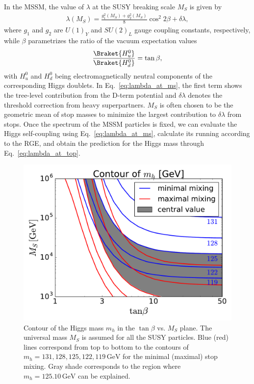 \documentclass[12pt,twoside,book]{article}
\begin{document}
In the MSSM, the value of $\lambda$ at the SUSY breaking scale $M_S$ is given by
\begin{align}
  \lambda (M_S) = \frac{g_1^2 (M_S) + g_2^2 (M_S)}{8} \cos^2 2\beta + \delta \lambda,
  \label{eq:lambda_at_ms}
\end{align}
where $g_1$ and $g_2$ are $U(1)_Y$ and $SU(2)_L$ gauge coupling constants, respectively, while $\beta$ parametrizes the ratio of the vacuum expectation values
\begin{align}
  \frac{\Braket{H_u^0}}{\Braket{H_d^0}} = \tan \beta,
\end{align}
with $H_u^0$ and $H_d^0$ being electromagnetically neutral components of the corresponding Higgs doublets.
In Eq.~\eqref{eq:lambda_at_ms}, the first term shows the tree-level contribution from the D-term potential and $\delta \lambda$ denotes the threshold correction from heavy superpartners.
$M_S$ is often chosen to be the geometric mean of stop masses to minimize the largest contribution to $\delta \lambda$ from stops.
Once the spectrum of the MSSM particles is fixed, we can evaluate the Higgs self-coupling using Eq.~\eqref{eq:lambda_at_ms}, calculate its running according to the RGE, and obtain the prediction for the Higgs mass through Eq.~\eqref{eq:lambda_at_top}.

\begin{figure}[t]
  \centering
  \includegraphics[width=0.6\hsize]{higgs_mass.pdf}
  \caption{
    Contour of the Higgs mass $m_h$ in the $\tan\beta$ vs. $M_S$ plane.
    The universal mass $M_S$ is assumed for all the SUSY particles.
    Blue (red) lines correspond from top to bottom to the contours of $m_h = 131, 128, 125, 122, 119\, \mathrm{GeV}$ for the minimal (maximal) stop mixing.
    Gray shade corresponds to the region where $m_h = 125.10\,\mathrm{GeV}$ can be explained.
  }
  \label{fig:higgs_mass}
\end{figure}
\end{document}
